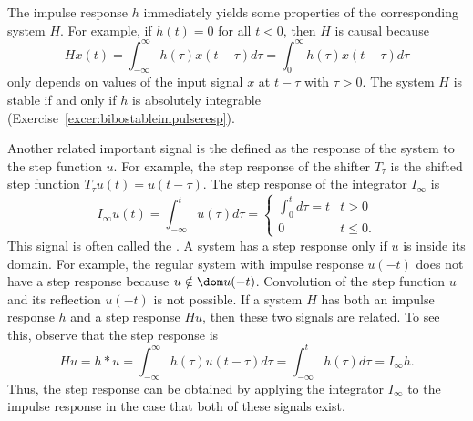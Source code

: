 

The impulse response $h$ immediately yields some properties of the corresponding system $H$.  For example, if $h(t) = 0$ for all $t < 0$, then $H$ is causal because 
\[
H x(t)  =  \int_{-\infty}^{\infty} h(\tau) x(t - \tau) d\tau = \int_{0}^{\infty} h(\tau) x(t - \tau) d\tau
\] 
only depends on values of the input signal $x$ at $t - \tau$ with $\tau > 0$.  The system $H$ is stable if and only if $h$ is absolutely integrable (Exercise~\ref{excer:bibostableimpulseresp}).

Another related important signal is the  defined as the response of the system to the step function $u$.  For example, the step response of the shifter $T_\tau$ is the shifted step function $T_\tau u(t) = u(t - \tau)$.  The step response of the integrator $I_\infty$ is
\[
I_\infty u(t) = \int_{-\infty}^t u(\tau) d\tau = \begin{cases}
\int_{0}^t d\tau  = t & t > 0 \\
0 & t \leq 0.
\end{cases}
\]
This signal is often called the .  A system has a step response only if $u$ is inside its domain.  For example, the regular system with impulse response $u(-t)$ does not have a step response because $u \notin \dom u(-t)$.  Convolution of the step function $u$ and its reflection $u(-t)$ is not possible.  If a system $H$ has both an impulse response $h$ and a step response $H u$, then these two signals are related.  To see this, observe that the step response is
\begin{equation}\label{eq:stepresponseintegrateimpulseresponse}
Hu = h * u = \int_{-\infty}^{\infty}h(\tau)u(t - \tau) d\tau = \int_{-\infty}^{t} h(\tau) d\tau = I_\infty h. 
\end{equation}
Thus, the step response can be obtained by applying the integrator $I_\infty$ to the impulse response in the case that both of these signals exist.

